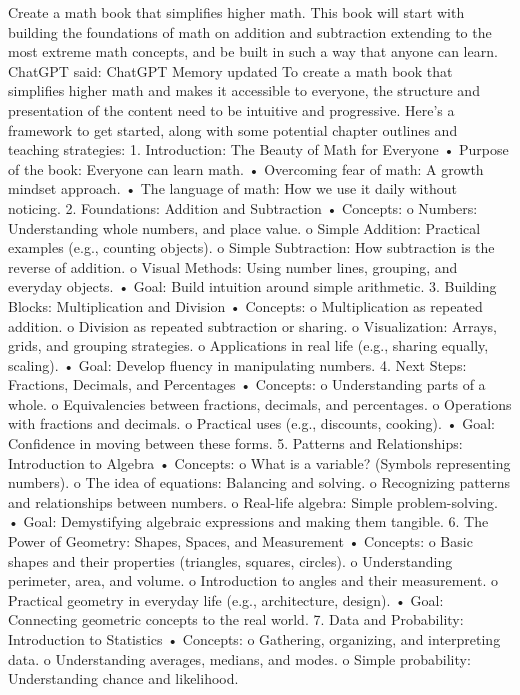 Create a math book that simplifies higher math. This book will start with building the foundations of math on addition and subtraction extending to the most extreme math concepts, and be built in such a way that anyone can learn. 
ChatGPT said:
ChatGPT
Memory updated
To create a math book that simplifies higher math and makes it accessible to everyone, the structure and presentation of the content need to be intuitive and progressive. Here’s a framework to get started, along with some potential chapter outlines and teaching strategies:
1. Introduction: The Beauty of Math for Everyone
•	Purpose of the book: Everyone can learn math.
•	Overcoming fear of math: A growth mindset approach.
•	The language of math: How we use it daily without noticing.
2. Foundations: Addition and Subtraction
•	Concepts:
o	Numbers: Understanding whole numbers, and place value.
o	Simple Addition: Practical examples (e.g., counting objects).
o	Simple Subtraction: How subtraction is the reverse of addition.
o	Visual Methods: Using number lines, grouping, and everyday objects.
•	Goal: Build intuition around simple arithmetic.
3. Building Blocks: Multiplication and Division
•	Concepts:
o	Multiplication as repeated addition.
o	Division as repeated subtraction or sharing.
o	Visualization: Arrays, grids, and grouping strategies.
o	Applications in real life (e.g., sharing equally, scaling).
•	Goal: Develop fluency in manipulating numbers.
4. Next Steps: Fractions, Decimals, and Percentages
•	Concepts:
o	Understanding parts of a whole.
o	Equivalencies between fractions, decimals, and percentages.
o	Operations with fractions and decimals.
o	Practical uses (e.g., discounts, cooking).
•	Goal: Confidence in moving between these forms.
5. Patterns and Relationships: Introduction to Algebra
•	Concepts:
o	What is a variable? (Symbols representing numbers).
o	The idea of equations: Balancing and solving.
o	Recognizing patterns and relationships between numbers.
o	Real-life algebra: Simple problem-solving.
•	Goal: Demystifying algebraic expressions and making them tangible.
6. The Power of Geometry: Shapes, Spaces, and Measurement
•	Concepts:
o	Basic shapes and their properties (triangles, squares, circles).
o	Understanding perimeter, area, and volume.
o	Introduction to angles and their measurement.
o	Practical geometry in everyday life (e.g., architecture, design).
•	Goal: Connecting geometric concepts to the real world.
7. Data and Probability: Introduction to Statistics
•	Concepts:
o	Gathering, organizing, and interpreting data.
o	Understanding averages, medians, and modes.
o	Simple probability: Understanding chance and likelihood.
